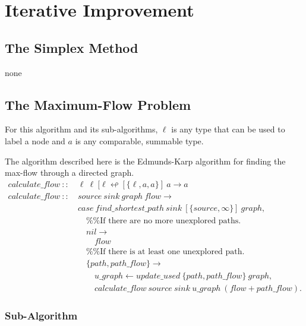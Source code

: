 \documentclass[a4paper,10pt]{book}
\begin{document}
\chapter{Iterative Improvement}
\section{The Simplex Method}
none
\section{The Maximum-Flow Problem}

For this algorithm and its sub-algorithms, $\ell$ is any type that can be used to label a node and $a$ is any comparable, summable type.

The algorithm described here is the Edmunds-Karp algorithm for finding the max-flow through a directed graph.
\begin{align*}
calculate\_flow\ ::\ &\ell\ \ell\ [\ell\looparrowleft [\{\ell,a,a\}]\ a\rightarrow a\\
calculate\_flow\ ::\ &source\ sink\ graph\ flow\rightarrow\\
	&case\ find\_shortest\_path\ sink\ [\{source,\infty\}]\ graph,\\
	&\quad\%\%\text{If there are no more unexplored paths.}\\
	&\quad nil\rightarrow\\
	&\qquad flow\\
	&\quad\%\%\text{If there is at least one unexplored path.}\\
	&\quad\{path,path\_flow\}\rightarrow\\
	&\qquad u\_graph\leftarrow update\_used\ \{path,path\_flow\}\ graph,\\
	&\qquad calculate\_flow\ source\ sink\ u\_graph\ (flow+path\_flow).
\end{align*}
\subsection{Sub-Algorithm}
\end{document}
